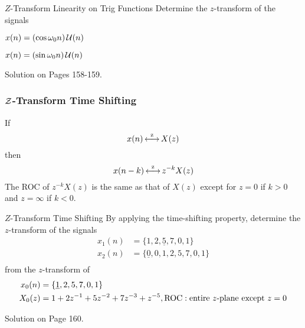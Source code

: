 \begin{example}[Example 3.2.2]{\texorpdfstring{$Z$-Transform}{Z-Transform} Linearity on Trig Functions}
  Determine the $z$-transform of the signals
  \begin{boldalphlist}
  \item $x(n) = \left( \cos \omega_{0}n \right) \operatorname{\mathcal{U}}(n)$
  \item $x(n) = \left( \sin \omega_{0}n \right) \operatorname{\mathcal{U}}(n)$
  \end{boldalphlist}

  \tcblower

  Solution on Pages 158-159.
\end{example}

\subsubsection{\texorpdfstring{$\operatorname{\mathcal{Z}}$-Transform}{Z-Transform} Time Shifting}\label{subsubsec:Z-Transform Time Shifting}
If
\begin{equation*}
  x(n) \operatorname{\overset{z}{\longleftrightarrow}} X(z)
\end{equation*}
then
\begin{equation}\label{eq:Z-Transform Time Shifting}
  x(n-k) \operatorname{\overset{z}{\longleftrightarrow}} z^{-k}X(z)
\end{equation}
The ROC of $z^{-k}X(z)$ is the same as that of $X(z)$ except for $z=0$ if $k > 0$ and $z = \infty$ if $k < 0$.

\begin{example}[Example 3.2.3]{\texorpdfstring{$Z$-Transform}{Z-Transform} Time Shifting}
  By applying the time-shifting property, determine the $z$-transform of the signals
  \begin{equation*}
    \begin{aligned}
      x_{1}(n) &= \lbrace 1, 2, \underline{5}, 7, 0, 1 \rbrace \\
      x_{2}(n) &= \lbrace \underline{0}, 0, 1, 2, 5, 7, 0, 1 \rbrace \\
    \end{aligned}
  \end{equation*}
  from the $z$-transform of
  \begin{equation*}
    \begin{aligned}
      x_{0}(n) &= \lbrace \underline{1}, 2, 5, 7, 0, 1 \rbrace \\
        X_{0}(z) &= 1 + 2z^{-1} + 5z^{-2} + 7z^{-3} + z^{-5}, \operatorname{\mathrm{ROC}}: \text{entire $z$-plane except } z=0 \\
      \end{aligned}
    \end{equation*}

    \tcblower

    Solution on Page 160.
\end{example}

